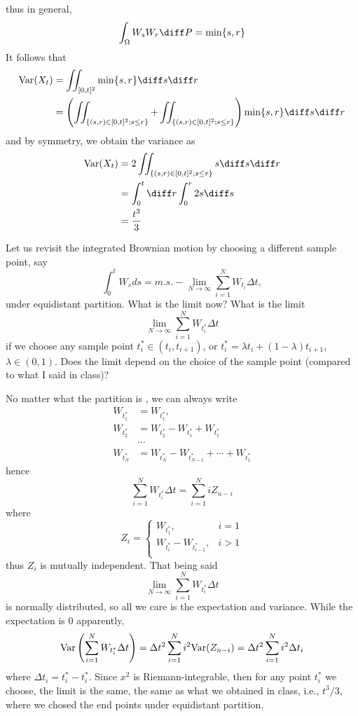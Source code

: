     thus in general,
    \[\int_\Omega W_sW_r\diff P=\min\{s,r\}\]
    It follows that
    \[\begin{aligned}
        \var(X_t)&=\iint_{[0,t]^2}\min\{s,r\}\diff s\diff r\\
        &=\left(\iint_{\{(s,r)\in[0,t]^2;s\leq r\}}
                +\iint_{\{(s,r)\in[0,t]^2;s\leq r\}}\right)
        \min\{s,r\}\diff s\diff r\\
    \end{aligned}\]
    and by symmetry, we obtain the variance as
    \[\begin{aligned}
        \var(X_t)&=2\iint_{\{(s,r)\in[0,t]^2;s\leq r\}}s\diff s\diff r\\
        &=\int_0^t\diff r\int_0^r2s\diff s\\
        &=\frac{t^3}{3}
    \end{aligned}\]

    \problem
    \begin{question}
        Let us revisit the integrated Brownian motion by choosing a different sample point, say
        \[\int_0^t W_sds=m.s.-\lim_{N\rightarrow \infty} \sum^N_{i=1}W_{t_i}\Delta t,\]
        under equidistant partition.  What is the limit now? What is the limit
        \[\lim_{N\rightarrow \infty} \sum^N_{i=1}W_{t^*_i}\Delta t\]
        if we choose any sample point $t_i^*\in(t_i,t_{i+1})$,
        or $t^*_i=\lambda t_i+(1-\lambda)t_{i+1}$, $\lambda \in (0,1)$. 
        Does the limit depend on the choice of the sample point (compared to what I said in class)?
    \end{question}
    No matter what the partition is
    , we can always write
    \[\begin{aligned}
        W_{t^*_1}&=W_{t^*_1},\\
        W_{t^*_2}&=W_{t^*_2}-W_{t^*_1}+W_{t^*_1}\\
        &\cdots\\
        W_{t^*_N}&=W_{t^*_N}-W_{t^*_{N-1}}+\cdots+W_{t^*_1}
    \end{aligned}\]
    hence
    \[\sum_{i=1}^NW_{t^*_i}\Delta t=\sum_{i=1}^NiZ_{n-i}\]
    where
    \[Z_i=\begin{cases}
        W_{t^*_1},&i=1\\
        W_{t^*_i}-W_{t^*_{i-1}},&i>1\\
    \end{cases}\]
    thus $Z_i$ is mutually independent.
    That being said
    \[\lim_{N\to\infty}\sum_{i=1}^N W_{t_i^*}\Delta t\]
    is normally distributed, so all we care is the expectation
    and variance. While the expectation is 0 apparently,
    \[\mathrm{Var}\left(\sum_{i=1}^N W_{t_i^*}\Delta t\right)
    =\Delta t^2\sum_{i=1}^Ni^2\mathrm{Var}(Z_{n-i})
    =\Delta t^2\sum_{i=1}^Ni^2\Delta t_i\]
    where $\Delta t_i=t^*_i-t^*_i$.
    Since $x^2$ is Riemann-integrable, then for any point $t_i^*$
    we choose, the limit is the same, the same as what we obtained
    in class, i.e., $t^3/3$, where we chosed the end points under
    equidistant partition.

